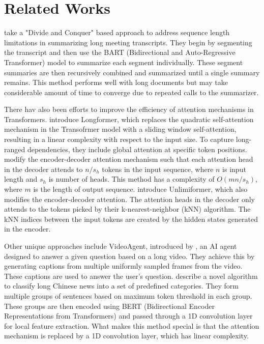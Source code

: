 \section{Related Works}

\citet{golia2024action} take a "Divide and Conquer" based approach to address
sequence length limitations in summarizing long meeting transcripts.
They begin by segmenting the transcript and then use the BART (Bidirectional and
Auto-Regressive Transformer) model to summarize each segment individually.
These segment summaries are then recursively combined and summarized until a single
summary remains.
This method performs well with long documents but may take considerable amount of time
to converge due to repeated calls to the summarizer.

There hav also been efforts to improve the efficiency of attention mechanisms in Transformers.
\citet{beltagy2020longformer} introduce Longformer, which replaces the quadratic
self-attention mechanism in the Transofrmer model with a sliding window self-attention,
resulting in a linear complexity with respect to the input size.
To capture long-ranged dependencies, they include global attention at specific token positions.
\citet{huang-etal-2021-efficient} modify the encoder-decoder attention mechanism such that
each attention head in the decoder attends to $n/s_h$ tokens in the input sequence, where
$n$ is input length and $s_h$ is number of heads.
This method has a complexity of $O(mn/s_h)$, where $m$ is the length of output sequence.
\citet{NEURIPS2023_6f9806a5} introduce Unlimiformer, which also modifies the encoder-decoder
attention.
The attention heads in the decoder only attends to the tokens picked by their
k-nearest-neighbor (kNN) algorithm.
The kNN indices between the input tokens are created by the hidden states generated in the
encoder.

Other unique approaches include VideoAgent, introduced by \citet{wang2024videoagent}, an
AI agent designed to answer a given question based on a long video.
They achieve this by generating captions from multiple uniformly sampled frames from the
video.
These captions are used to answer the user's question.
\citet{chen2022long} describe a novel algorithm to classify long Chinese news into a set
of predefined categories.
They form multiple groups of sentences based on maximum token threshold in each group.
These groups are then encoded using BERT (Bidirectional Encoder Representations from
Transformers) and passed through a 1D convolution layer for local feature extraction.
What makes this method special is that the attention mechanism is replaced by a 1D
convolution layer, which has linear complexity.
